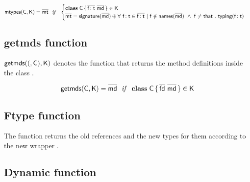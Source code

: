\documentclass[a4paper,USenglish]{tex/lipics-v2016}
\begin{document}
\begin{equation*}
\classoff\C\K = \b\mt ~~\mathit{if}~~ \begin{cases}

 \Class \C {\b{\Ftype\f\t}}{\b\md} \in \K\\
 \b\mt = \sign{\b\md} \oplus \forall ~\Ftype\f\t \in \b{\Ftype\f\t} ~|~ \f \notin \names{\b\md} ~\wedge~ \f\neq\that ~.~ \typez{\Ftype\f\t}

\end{cases}
\end{equation*}

\subsection{getmds function}

$\getmds(\C,\K)$ denotes the function that returns the method definitions inside the class \C.

\begin{equation*}
\getmds\C\K = \b\md ~~\mathit{if}~~ \Class\C{\b{\fd}}{\b\md} \in \K
\end{equation*}

\subsection{Ftype function}

The function \ftypes\a\C\s\K returns the old references and the new types
for them according to the new wrapper \C.

\begin{mathpar}
\end{mathpar}


\subsection{Dynamic function}

\begin{mathpar}



\end{mathpar}
\end{document}
